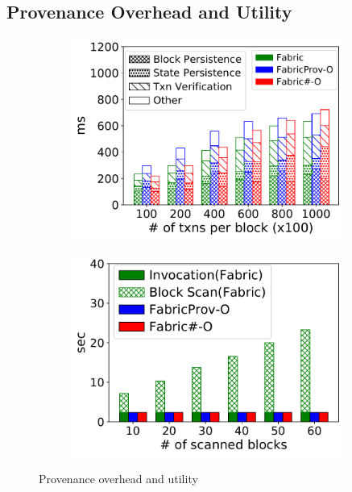 \subsection{Provenance Overhead and Utility}
\label{sec:provenance:exp:util}
\begin{figure}[tp]
	\centering
    \begin{subfigure}{0.45\textwidth}
      \includegraphics[width=0.99\textwidth]{chart/provenance/ycsb_breakdown.pdf}
      \caption{}
      \label{chart:provenance:ycsb_breakdown}
    \end{subfigure}
    \begin{subfigure}{0.45\textwidth}
      \includegraphics[width=0.99\textwidth]{chart/provenance/smallbank_util.pdf}
      \caption{}
      \label{chart:provenance:smallbank_util}
    \end{subfigure}
    \caption{Provenance overhead and utility }
\end{figure}
